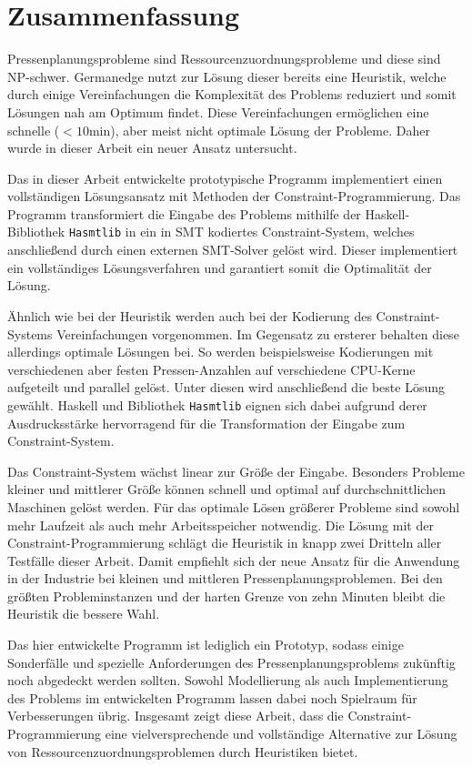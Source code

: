 \chapter{Zusammenfassung}
\label{chapter:zusammenfassung}
Pressenplanungsprobleme sind Ressourcenzuordnungsprobleme und diese sind NP-schwer.
Germanedge nutzt zur Lösung dieser bereits eine Heuristik, welche durch einige Vereinfachungen die Komplexität des Problems reduziert und somit
Lösungen nah am Optimum findet.
Diese Vereinfachungen ermöglichen eine schnelle ($< 10 \text{min}$), aber meist nicht optimale Lösung der Probleme.
Daher wurde in dieser Arbeit ein neuer Ansatz untersucht.

Das in dieser Arbeit entwickelte prototypische Programm implementiert einen vollständigen Lösungsansatz mit Methoden der Constraint-Programmierung.
Das Programm transformiert die Eingabe des Problems mithilfe der Haskell-Bibliothek \texttt{Hasmtlib} in ein in SMT kodiertes Constraint-System,
welches anschließend durch einen externen SMT-Solver gelöst wird.
Dieser implementiert ein vollständiges Lösungsverfahren und garantiert somit die Optimalität der Lösung.

Ähnlich wie bei der Heuristik werden auch bei der Kodierung des Constraint-Systems Vereinfachungen vorgenommen.
Im Gegensatz zu ersterer behalten diese allerdings optimale Lösungen bei.
So werden beispielsweise Kodierungen mit verschiedenen aber festen Pressen-Anzahlen auf verschiedene CPU-Kerne aufgeteilt und parallel gelöst.
Unter diesen wird anschließend die beste Lösung gewählt.
Haskell und Bibliothek \texttt{Hasmtlib} eignen sich dabei aufgrund derer Ausdrucksstärke hervorragend für die Transformation der Eingabe zum Constraint-System.

Das Constraint-System wächst linear zur Größe der Eingabe.
Besonders Probleme kleiner und mittlerer Größe können schnell und optimal auf durchschnittlichen Maschinen gelöst werden.
Für das optimale Lösen größerer Probleme sind sowohl mehr Laufzeit als auch mehr Arbeitsspeicher notwendig.
Die Lösung mit der Constraint-Programmierung schlägt die Heuristik in knapp zwei Dritteln aller Testfälle dieser Arbeit.
Damit empfiehlt sich der neue Ansatz für die Anwendung in der Industrie bei kleinen und mittleren Pressenplanungsproblemen.
Bei den größten Probleminstanzen und der harten Grenze von zehn Minuten bleibt die Heuristik die bessere Wahl.

Das hier entwickelte Programm ist lediglich ein Prototyp, sodass einige Sonderfälle und spezielle Anforderungen
des Pressenplanungsproblems zukünftig noch abgedeckt werden sollten.
Sowohl Modellierung als auch Implementierung des Problems im entwickelten Programm lassen dabei noch Spielraum für Verbesserungen übrig.
Insgesamt zeigt diese Arbeit, dass die Constraint-Programmierung eine vielversprechende und vollständige
Alternative zur Lösung von Ressourcenzuordnungsproblemen durch Heuristiken bietet.
